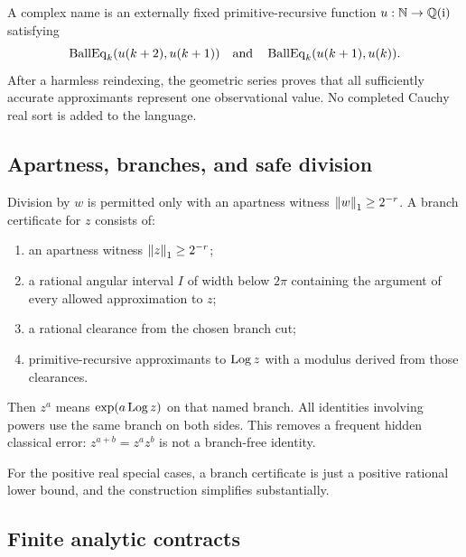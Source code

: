 A complex name is an externally fixed primitive-recursive function
$u:\mathbb N\to\mathbb Q(\mathrm i)$ satisfying
\begin{equation}\label{eq:name-coherence}
 \operatorname{BallEq}_k(u(k+2),u(k+1))
 \quad\text{and}\quad
 \operatorname{BallEq}_k(u(k+1),u(k)).
\end{equation}
After a harmless reindexing, the geometric series proves that all sufficiently
accurate approximants represent one observational value.  No completed Cauchy
real sort is added to the language.

\subsection{Apartness, branches, and safe division}

Division by $w$ is permitted only with an apartness witness
$\left\lVert w\right\rVert_1\ge2^{-r}$.  A branch certificate for $z$ consists of:
\begin{enumerate}
\item an apartness witness $\left\lVert z\right\rVert_1\ge2^{-r}$;
\item a rational angular interval $I$ of width below $2\pi$ containing the
      argument of every allowed approximation to $z$;
\item a rational clearance from the chosen branch cut;
\item primitive-recursive approximants to $\operatorname{Log} z$ with a modulus derived from
      those clearances.
\end{enumerate}
Then $z^a$ means $\exp(a\operatorname{Log} z)$ on that named branch.  All identities involving
powers use the same branch on both sides.  This removes a frequent hidden
classical error: $z^{a+b}=z^az^b$ is not a branch-free identity.

For the positive real special cases, a branch certificate is just a positive
rational lower bound, and the construction simplifies substantially.

\subsection{Finite analytic contracts}

